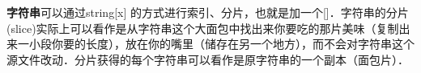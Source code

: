 

\textbf{字符串}可以通过string[x] 的方式进行索引、分片，也就是加一个[]．字符串的分片(slice)实际上可以看作是从字符串这个大面包中找出来你要吃的那片美味（复制出来一小段你要的长度），放在你的嘴里（储存在另一个地方），而不会对字符串这个源文件改动．分片获得的每个字符串可以看作是原字符串的一个副本（面包片）．